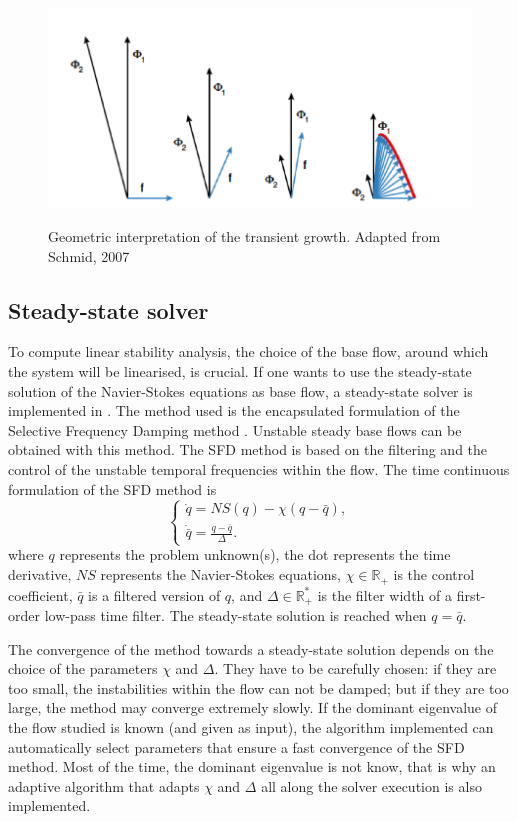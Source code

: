 \begin{figure}[!htbp]
\centering
 \label{TG}
 {\includegraphics[width=1 \textwidth]{Figures/transient_growth.png}}
   \caption {Geometric interpretation of the transient growth. Adapted from Schmid, 2007 }
\end{figure}


\subsection{Steady-state solver}
\label{SectionSFD}

To compute linear stability analysis, the choice of the base flow, around which the system will be linearised, is crucial. If one wants to use the steady-state solution of the Navier-Stokes equations as base flow, a steady-state solver is implemented in \nekpp. The method used is the encapsulated formulation of the Selective Frequency Damping method \cite{JoCoSh14}. Unstable steady base flows can be obtained with this method. The SFD method is based on the filtering and the control of the unstable temporal frequencies within the flow. The time continuous formulation of the SFD method is
\begin{equation}
\begin{cases}
\dot{q}=NS(q)-\chi (q-\bar{q}), \\
\dot{\bar{q}}=\frac{q-\bar{q}}{\Delta}.
\end{cases}
\label{SFD-General}
\end{equation}
where $q$ represents the problem unknown(s), the dot represents the time derivative, $NS$ represents the Navier-Stokes equations, $\chi \in \mathbb{R}_+$ is the control coefficient, $\bar{q}$ is a filtered version of $q$, and $\Delta \in \mathbb{R}_+ ^*$ is the filter width of a first-order low-pass time filter. The steady-state solution is reached when $q=\bar{q}$.

The convergence of the method towards a steady-state solution depends on the choice of the parameters $\chi$ and $\Delta$. They have to be carefully chosen: if they are too small, the instabilities within the flow can not be damped; but if they are too large, the method may converge extremely slowly. If the dominant eigenvalue of the flow studied is known (and given as input), the algorithm implemented can automatically select parameters that ensure a fast convergence of the SFD method. Most of the time, the dominant eigenvalue is not know, that is why an adaptive algorithm that adapts $\chi$ and $\Delta$ all along the solver execution is also implemented.

